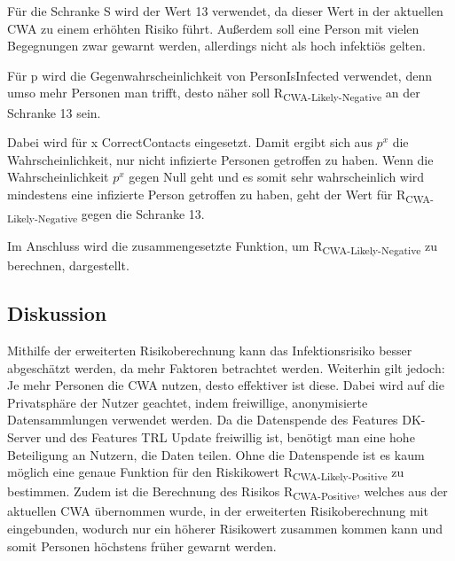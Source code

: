 \documentclass[conference,compsoc]{IEEEtran}
\begin{document}
\centerline{\text{ }}
\centerline{}
\centerline{\text{ }}

Für die Schranke S wird der Wert 13 verwendet, da dieser Wert in der aktuellen CWA zu einem erhöhten Risiko führt. 
Außerdem soll eine Person mit vielen Begegnungen zwar gewarnt werden, allerdings nicht als hoch infektiös gelten.

Für p wird die Gegenwahrscheinlichkeit von PersonIsInfected verwendet, denn umso mehr Personen man trifft, 
desto näher soll R\textsubscript{CWA-Likely-Negative} an der Schranke 13 sein. 

Dabei wird für x CorrectContacts eingesetzt. 
Damit ergibt sich aus $p^x$ die Wahrscheinlichkeit, nur nicht infizierte Personen getroffen zu haben. 
Wenn die Wahrscheinlichkeit $p^x$ gegen Null geht und es somit sehr wahrscheinlich wird mindestens eine infizierte Person getroffen zu haben,
geht der Wert für R\textsubscript{CWA-Likely-Negative} gegen die Schranke 13.

Im Anschluss wird die zusammengesetzte Funktion, um R\textsubscript{CWA-Likely-Negative} zu berechnen, dargestellt.

\centerline{\text{ }}
\centerline{}
\centerline{}
\centerline{\text{ }}

\subsection{Diskussion}\label{Bewertung_Risikoberechnung}

Mithilfe der erweiterten Risikoberechnung kann das Infektionsrisiko besser abgeschätzt werden,
da mehr Faktoren betrachtet werden. Weiterhin gilt jedoch: Je mehr Personen die CWA nutzen, desto effektiver ist diese.
Dabei wird auf die Privatsphäre der Nutzer geachtet, indem freiwillige, anonymisierte Datensammlungen verwendet werden.
Da die Datenspende des Features DK-Server und des Features TRL Update freiwillig ist, benötigt man eine hohe Beteiligung an Nutzern, die Daten teilen.
Ohne die Datenspende ist es kaum möglich eine genaue Funktion für den Riskikowert R\textsubscript{CWA-Likely-Positive} zu bestimmen. 
Zudem ist die Berechnung des Risikos R\textsubscript{CWA-Positive}, welches aus der aktuellen CWA übernommen wurde,
in der erweiterten Risikoberechnung mit eingebunden, wodurch nur ein höherer Risikowert zusammen kommen kann
und somit Personen höchstens früher gewarnt werden. 
\end{document}
